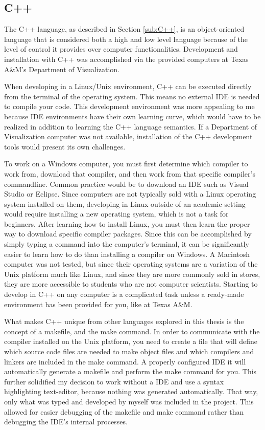 \subsection{C++}
The C++ language, as described in Section \ref{sub:C++}, is an object-oriented language that is considered both a high and low level language because of the level of control it provides over computer functionalities.  Development and installation with C++ was accomplished via the provided computers at Texas A\&M's Department of Visualization.

When developing in a Linux/Unix environment, C++ can be executed directly from the terminal of the operating system.  This means no external IDE is needed to compile your code.  This development environment was more appealing to me because IDE environments have their own learning curve, which would have to be realized in addition to learning the C++ language semantics.  If a Department of Visualization computer was not available, installation of the C++ development tools would present its own challenges.

To work on a Windows computer, you must first determine which compiler to work from, download that compiler, and then work from that specific compiler's commandline.  Common practice would be to download an IDE such as Visual Studio or Eclipse.  Since computers are not typically sold with a Linux operating system installed on them, developing in Linux outside of an academic setting would require installing a new operating system, which is not a task for beginners.  After learning how to install Linux, you must then learn the proper way to download specific compiler packages. Since this can be accomplished by simply typing a command into the computer's terminal, it can be significantly easier to learn how to do than installing a compiler on Windows.  A Macintosh computer was not tested, but since their operating systems are a variation of the Unix platform much like Linux, and since they are more commonly sold in stores, they are more accessible to students who are not computer scientists.  Starting to develop in C++ on any computer is a complicated task unless a ready-made environment has been provided for you, like at Texas A\&M.

What makes C++ unique from other languages explored in this thesis is the concept of a makefile, and the make command. In order to communicate with the compiler installed on the Unix platform, you need to create a file that will define which source code files are needed to make object files and which compilers and linkers are included in the make command.  A properly configured IDE it will automatically generate a makefile and perform the make command for you.  This further solidified my decision to work without a IDE and use a syntax highlighting text-editor, because nothing was generated automatically. That way, only what was typed and developed by myself was included in the project.  This allowed for easier debugging of the makefile and make command rather than debugging the IDE's internal processes.

